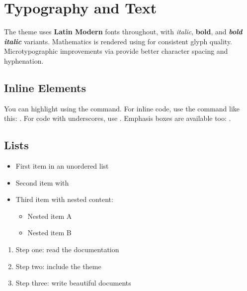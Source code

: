 \documentclass[11pt, a4paper]{scrartcl}
\begin{document}

\section{Typography and Text}

The theme uses \textbf{Latin Modern} fonts throughout, with \textit{italic},
\textbf{bold}, and \textbf{\textit{bold italic}} variants. Mathematics is rendered
using  for consistent glyph quality. Microtypographic
improvements via  provide better character spacing and hyphenation.

\subsection{Inline Elements}

You can highlight  using the \code{\\hltext} command.
For inline code, use the \code{\\code} command like this: .
For code with underscores, use .
Emphasis boxes are available too: .

\subsection{Lists}

\begin{itemize}
  \item First item in an unordered list
  \item Second item with 
  \item Third item with nested content:
    \begin{itemize}
      \item Nested item A
      \item Nested item B
    \end{itemize}
\end{itemize}

\begin{enumerate}
  \item Step one: read the documentation
  \item Step two: include the theme
  \item Step three: write beautiful documents
\end{enumerate}
\end{document}
